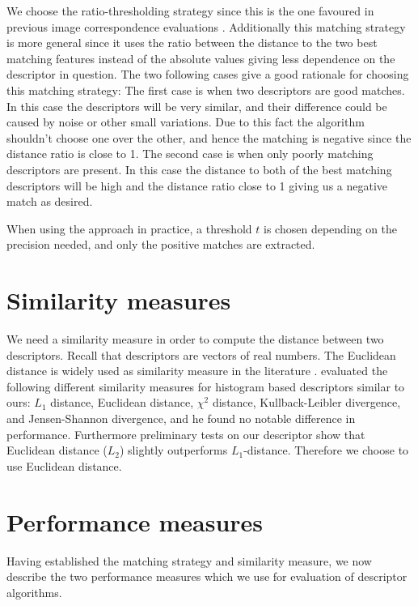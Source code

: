 \documentclass[thesis.tex]{subfiles}
\begin{document}
We choose the ratio-thresholding strategy since this is the one favoured in previous image correspondence evaluations \cite{mikolajczyk2005performance,dahl2011finding,larsen2012jet,lowe2004distinctive}. Additionally this matching strategy is more general since it uses the ratio between the distance to the two best matching features instead of the absolute values giving less dependence on the descriptor in question. The two following cases give a good rationale for choosing this matching strategy: The first case is when two descriptors are good matches. In this case the descriptors will be very similar, and their difference could be caused by noise or other small variations. Due to this fact the algorithm shouldn't choose one over the other, and hence the matching is negative since the distance ratio is close to 1. The second case is when only poorly matching descriptors are present. In this case the distance to both of the best matching descriptors will be high and the distance ratio close to 1 giving us a negative match as desired.

When using the approach in practice, a threshold $t$ is chosen depending on the precision needed, and only the positive matches are extracted.


\section{Similarity measures}
\label{sec:similarity_measure}
We need a similarity measure in order to compute the distance between two descriptors. Recall that descriptors are vectors of real numbers. The Euclidean distance is widely used as similarity measure in the literature \cite{lowe2004distinctive,ke2004pca,mikolajczyk2005performance}. \citet{larsen2012in} evaluated the following different similarity measures for histogram based descriptors similar to ours: $L_1$ distance, Euclidean distance, $\chi^2$ distance, Kullback-Leibler divergence, and Jensen-Shannon divergence, and he found no notable difference in performance. Furthermore preliminary tests on our descriptor show that Euclidean distance ($L_2$) slightly outperforms $L_1$-distance. Therefore we choose to use Euclidean distance.

\section{Performance measures}
\label{sec:performance_measures}

Having established the matching strategy and similarity measure, we now describe the two performance measures which we use for evaluation of descriptor algorithms.
\end{document}
